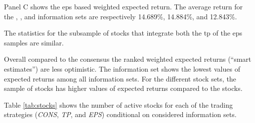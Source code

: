 \documentclass[a4paper,twoside,12pt,openright,notitlepage]{report}\usepackage[]{graphicx}\usepackage[]{color}
\begin{document}
Panel C shows the \gls{eps} based weighted expected return. The average return for the \tr{}, \naive{}, and  information sets are respectively 14.689\%, 14.884\%, and 12.843\%.


The statistics for the subsample of stocks that integrate both the \gls{tp} of the \gls{eps} samples are similar.


Overall compared to the consensus the ranked weighted expected returns (``smart estimates'') are less optimistic. The  information set shows the lowest values of expected returns among all information sets. For the different stock sets,  the \same{} sample of stocks has higher values of expected returns compared to the \all{} stocks.

Table \ref{tab:stocks} shows the number of active stocks for each of the trading strategies (\textit{CONS}, \textit{TP}, and \textit{EPS}) conditional on considered information sets.
\end{document}
